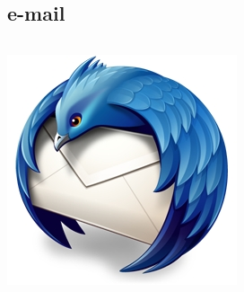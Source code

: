\subsection{e-mail}
\begin{frame}
    \begin{columns}
            \includegraphics[width=\textwidth]{Mozilla_Thunderbird_logo.png}
    \end{columns}
\end{frame}

